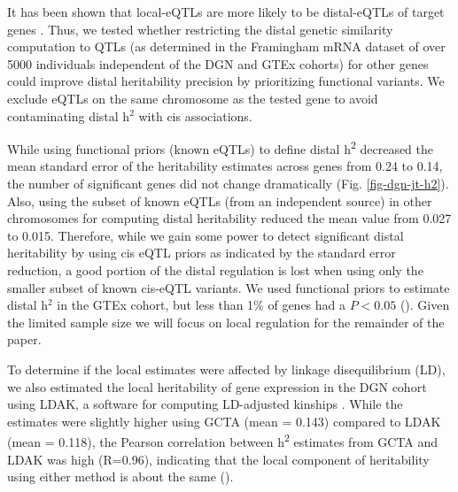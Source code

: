 \documentclass[10pt,letterpaper]{article}
\begin{document}
It has been shown that local-eQTLs are more likely to be distal-eQTLs of target genes \cite{pierce2014mediation}. Thus, we tested whether restricting the distal genetic similarity computation to QTLs (as determined in the Framingham mRNA dataset of over 5000 individuals \cite{Zhang_2015}  independent of the DGN and GTEx cohorts) for other genes could improve distal heritability precision by prioritizing functional variants. We exclude eQTLs on the same chromosome as the tested gene to avoid contaminating distal h$^2$ with cis associations.

While using functional priors (known eQTLs) to define distal h\textsuperscript{2} decreased the mean standard error of the heritability estimates across genes from 0.24 to 0.14, the number of significant genes did not change dramatically (Fig. \ref{fig-dgn-jt-h2}). Also, using the subset of known eQTLs (from an independent source) in other chromosomes for computing distal heritability reduced the mean value from 0.027 to 0.015. Therefore, while we gain some power to detect significant distal heritability by using cis eQTL priors as indicated by the standard error reduction, a good portion of the distal regulation is lost when using only the smaller subset of known cis-eQTL variants. We used functional priors to estimate distal h$^2$ in the GTEx cohort, but less than 1\% of genes had a $P < 0.05$ (). Given the limited sample size we will focus on local regulation for the remainder of the paper.

To determine if the local estimates were affected by linkage disequilibrium (LD), we also estimated the local heritability of gene expression in the DGN cohort using LDAK, a software for computing LD-adjusted kinships \cite{speed2012improved}. While the estimates were slightly higher using GCTA (mean = 0.143) compared to LDAK (mean = 0.118), the Pearson correlation between h\textsuperscript{2} estimates from GCTA and LDAK was high (R=0.96), indicating that the local component of heritability using either method is about the same ().
\end{document}
